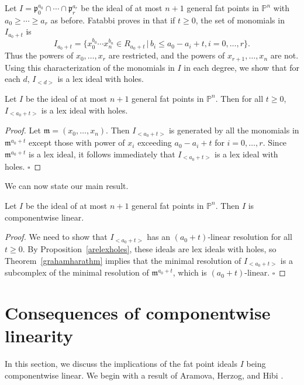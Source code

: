\documentclass{article}
\begin{document}
Let $I = \mathfrak p_0^{a_0} \cap \cdots \cap \mathfrak p_r^{a_r}$ be the ideal of at most $n+1$ general fat points in $\mathbb P^n$ with $a_0 \ge \cdots \ge a_r$ as before. Fatabbi proves in \cite{Fatabbi} that if $t \ge 0$, the set of monomials in $I_{a_0+t}$ is \[ I_{a_0+t} = \{x_0^{b_0}\cdots x_n^{b_n} \in R_{a_0+t} \, | \, b_i \le a_0-a_i+t, i=0,\dots,r\}.\] Thus the powers of $x_0,\dots,x_r$ are restricted, and the powers of $x_{r+1},\dots,x_n$ are not. Using this characterization of the monomials in $I$ in each degree, we show that for each $d$, $I_{<d>}$ is a lex ideal with holes.

\begin{proposition}
\label{arelexholes}
Let $I$ be the ideal of at most $n+1$ general fat points in $\mathbb P^n$. Then for all $t \ge 0$, $I_{<a_0+t>}$ is a lex ideal with holes.
\end{proposition}

\begin{proof}
Let $\mathfrak m=(x_0,\dots,x_n)$. Then $I_{<a_0+t>}$ is generated by all the monomials in $\mathfrak m^{a_0+t}$ except those with power of $x_i$ exceeding $a_0-a_i+t$ for $i=0,\dots,r$. Since $\mathfrak m^{a_0+t}$ is a lex ideal, it follows immediately that $I_{<a_0+t>}$ is a lex ideal with holes. \hfill $\square$
\end{proof}

We can now state our main result.

\begin{theorem}
\label{mainthm}
Let $I$ be the ideal of at most $n+1$ general fat points in $\mathbb P^n$. Then $I$ is componentwise linear.
\end{theorem}

\begin{proof}
We need to show that $I_{<a_0+t>}$ has an $(a_0+t)$-linear resolution for all $t \ge 0$. By Proposition~\ref{arelexholes}, these ideals are lex ideals with holes, so Theorem~\ref{grahamharathm} implies that the minimal resolution of $I_{<a_0+t>}$ is a subcomplex of the minimal resolution of $\mathfrak m^{a_0+t}$, which is $(a_0+t)$-linear. \hfill $\square$
\end{proof}

\section[5]{Consequences of componentwise linearity}\label{s:conseq}

In this section, we discuss the implications of the fat point ideals $I$ being componentwise linear. We begin with a result of Aramova, Herzog, and Hibi \cite{AAH:stable}.
\end{document}
